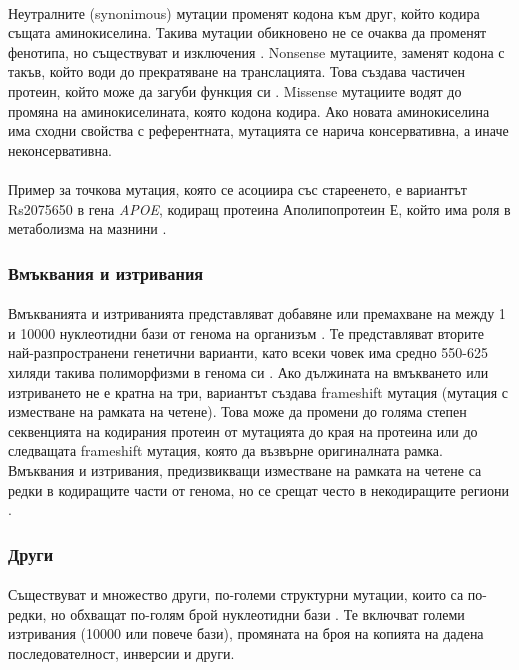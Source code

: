 \documentclass[pdftex,cyrillic,14pt,a4page,twoside,openright]{extreport}
\begin{document}
\paragraph{}
Неутралните (synonimous) мутации променят кодона към друг, който кодира същата аминокиселина. Такива мутации обикновено не се очаква да променят фенотипа, но съществуват и изключения \cite{kimchi2007}. Nonsense мутациите, заменят кодона с такъв, който води до прекратяване на транслацията. Това създава частичен протеин, който може да загуби функция си \cite{bidou2012}. Missense мутациите водят до промяна на аминокиселината, която кодона кодира. Ако новата аминокиселина има сходни свойства с референтната, мутацията се нарича консервативна, а иначе неконсервативна.

\paragraph{}
Пример за точкова мутация, която се асоциира със стареенето, е вариантът Rs2075650 в гена \textit{APOE}, кодиращ протеина Аполипопротеин Е, който има роля в метаболизма на мазнини \cite{deelen2011}\cite{lu2014}.

\subsubsection{Вмъквания и изтривания}
\paragraph{}
Вмъкванията и изтриванията представляват добавяне или премахване на между 1 и 10000 нуклеотидни бази от генома на организъм \cite{mullaney2010}. Те представляват вторите най-разпространени генетични варианти, като всеки човек има средно 550-625 хиляди такива полиморфизми в генома си \cite{auton2015}. Ако дължината на вмъкването или изтриването не е кратна на три, вариантът създава frameshift мутация (мутация с изместване на рамката на четене). Това може да промени до голяма степен секвенцията на кодирания протеин от мутацията до края на протеина или до следващата frameshift мутация, която да възвърне оригиналната рамка. Вмъквания и изтривания, предизвикващи изместване на рамката на четене са редки в кодиращите части от генома, но се срещат често в некодиращите региони \cite{bai2013}.

\subsubsection{Други}
\paragraph{}
Съществуват и множество други, по-големи структурни мутации, които са по-редки, но обхващат по-голям брой нуклеотидни бази \cite{auton2015}. Те включват големи изтривания (10000 или повече бази), промяната на броя на копията на дадена последователност, инверсии и други.
\end{document}
